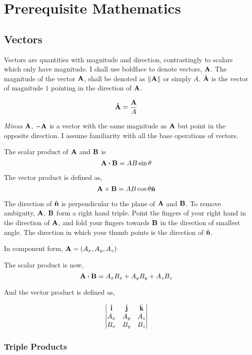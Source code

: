 \chapter{Prerequisite Mathematics}

\section{Vectors}

Vectors are quantities with magnitude and direction, contrastingly to scalars which only have magnitude.
I shall use boldface to denote vectors, \(\boldsymbol{\mathbf{A}}\). The magnitude of the vector \(\boldsymbol{\mathbf{A}}\),
shall be denoted as \(\norm{\boldsymbol{\mathbf{A}}}\) or simply \(A\). \({\hat{\boldsymbol{\mathbf{A}}}}\) is 
the vector of magnitude \(1\) pointing in the direction of \(\boldsymbol{\mathbf{A}}\).

\[
    {\hat{\boldsymbol{\mathbf{A}}}} = \frac{\boldsymbol{\mathbf{A}}}{A}
\]

\emph{Minus} \(\boldsymbol{\mathbf{A}}\), \(-\boldsymbol{\mathbf{A}}\) is a vector with the same magnitude as \(\boldsymbol{\mathbf{A}}\)
but point in the opposite direction. I assume familiarity with all the base operations of 
vectors.  

The scalar product of \(\boldsymbol{\mathbf{A}}\) and \(\boldsymbol{\mathbf{B}}\) is
\[
    \vect{A} \dotproduct \vect{B} = AB \sin \theta
\]

The vector product is defined as,
\[
    \boldsymbol{\mathbf{A}} \times \boldsymbol{\mathbf{B}} = AB \cos \theta {\hat{\boldsymbol{\mathbf{n}}}}
\]

The direction of \({\hat{\boldsymbol{\mathbf{n}}}}\) is perpendicular to the plane of \(\boldsymbol{\mathbf{A}}\) and \(\boldsymbol{\mathbf{B}}\). 
To remove ambiguity, \(\boldsymbol{\mathbf{A}}\), \(\boldsymbol{\mathbf{B}}\) form a right hand triple. Point the
fingers of your right hand in the direction of \(\boldsymbol{\mathbf{A}}\), and fold your fingers towards
\(\boldsymbol{\mathbf{B}}\) in the direction of smallest angle. The direction in which your thumb points
is the direction of \({\hat{\boldsymbol{\mathbf{n}}}}\).

In component form,
\(\boldsymbol{\mathbf{A}} = (A_x, A_y, A_z)\)

The scalar product is now,
\[
    \vect{A} \dotproduct \vect{B} = A_xB_x + A_yB_y + A_zB_z
\]

And the vector product is defined as, 

\[
\begin{vmatrix}
    {\hat{\boldsymbol{\mathbf{i}}}} & {\hat{\boldsymbol{\mathbf{j}}}} & {\hat{\boldsymbol{\mathbf{k}}}} \\
    A_x & A_y & A_z \\
    B_x & B_y & B_z
\end{vmatrix}
\]

\subsection{Triple Products}


